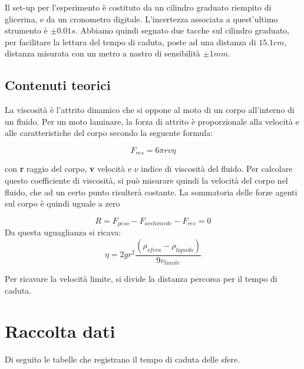 Il set-up per l'esperimento è costituto da un cilindro graduato riempito di glicerina, e  da un cronometro digitale. L'incertezza associata a quest'ultimo strumento è $\pm0.01s$. Abbiamo quindi segnato due tacche sul cilindro graduato, per facilitare la lettura del tempo di caduta, poste ad una distanza di $15.1 cm$, distanza misurata con un metro a nastro di sensibilità $\pm 1mm$.

\subsection{Contenuti teorici}
La viscosità è l'attrito dinamico che si oppone al moto di un corpo all'interno di un fluido. Per un moto laminare, la forza di attrito è proporzionale alla velocità e alle caratteristiche del corpo secondo la seguente formula:

$$F_{res} = 6 \pi r v \eta $$

con \textbf{r}  raggio del corpo,\textbf{ v} velocità e $\nu$ indice di viscosità del fluido. 
Per calcolare questo coefficiente di viscosità, si può misurare quindi la velocità del corpo nel fluido, che ad un certo punto risulterà costante. La sommatoria delle forze agenti sul corpo è quindi uguale a zero

$$ R = F_{peso} - F_{archimede} - F_{res} = 0 $$
Da questa uguaglianza si ricava:
\\
\begin{equation}\label{eta}
\eta= 2 g r^2\frac{(\rho_{sfera} - \rho_{liquido})}{9v_{limite}}
\end{equation}

Per ricavare la velocità limite, si divide la distanza percorsa per il tempo di caduta. 

\section{Raccolta dati}
Di seguito le tabelle che registrano il tempo di caduta delle sfere.
